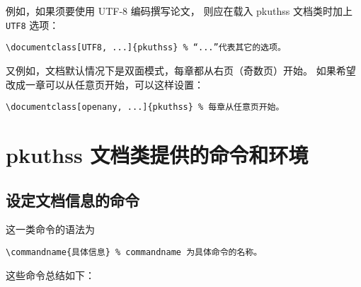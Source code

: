 例如，如果须要使用 UTF-8 编码撰写论文，
则应在载入 pkuthss 文档类时加上 \verb|UTF8| 选项：
\begin{Verbatim}[frame = single]
\documentclass[UTF8, ...]{pkuthss} % “...”代表其它的选项。
\end{Verbatim}

又例如，文档默认情况下是双面模式，每章都从右页（奇数页）开始。
如果希望改成一章可以从任意页开始，可以这样设置：
\begin{Verbatim}[frame = single]
\documentclass[openany, ...]{pkuthss} % 每章从任意页开始。
\end{Verbatim}

\section{pkuthss 文档类提供的命令和环境}
\subsection{设定文档信息的命令}

这一类命令的语法为
\begin{Verbatim}[frame = single]
\commandname{具体信息} % commandname 为具体命令的名称。
\end{Verbatim}

这些命令总结如下：

